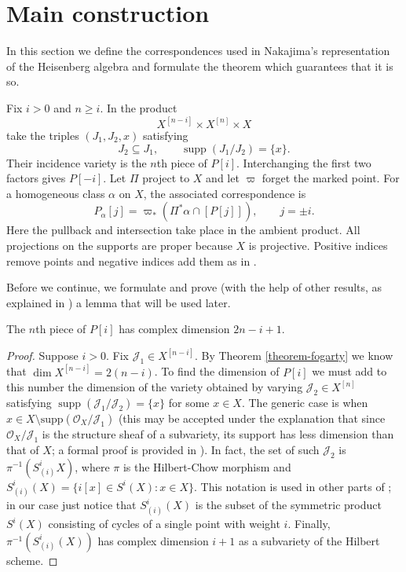 \section{Main construction}
\label{section-main-construction}

\noindent
In this section we define the
correspondences used in Nakajima's
representation
of the Heisenberg algebra and formulate
the theorem which guarantees that it is so.

Fix $i>0$ and $n\geq i$. In the product
$$
X^{[n-i]}\times X^{[n]}\times X
$$
take the triples $(J_1,J_2,x)$ satisfying
$$
J_2\subseteq J_1,\qquad
\operatorname{supp}(J_1/J_2)=\{x\}.
$$
Their incidence variety is the $n$th piece
of $P[i]$. Interchanging the first two
factors gives $P[-i]$. Let $\Pi$ project to
$X$ and let $\varpi$ forget the marked
point. For a homogeneous class $\alpha$ on
$X$, the associated correspondence is
\begin{equation}
\label{equation-correspondence-p}
P_\alpha[j]=\varpi_*
  (\Pi^*\alpha\cap[P[j]]),\qquad j=\pm i.
\end{equation}
Here the pullback and intersection take
place in the ambient product. All
projections on the supports are proper
because $X$ is projective. Positive indices
remove points and negative indices add them
as in \cite[Equation
(8.12)]{Nakajima-lectures}.

\medskip\noindent
Before we continue, we formulate and
prove (with the help of other results,
as explained in \cite[Section
8.3]{Nakajima-lectures})
a lemma that will be used later.

\begin{lemma}
\label{lemma-dimension}
The $n$th piece of $P[i]$ has complex
dimension $2n-i+1$.
\end{lemma}

\begin{proof}
Suppose $i>0$.
Fix $\mathcal{J}_1 \in X^{[n-i]}$.
By Theorem \ref{theorem-fogarty} we know that
$\dim X^{[n-i]}=2(n-i)$.
To find the dimension of $P[i]$
we must add to this number the dimension of
the variety
obtained by varying  $\mathcal{J}_2 \in
X^{[n]}$
satisfying
$\operatorname{supp}(\mathcal{J}_1/
\mathcal{J}_2)=\{x\}$
for some $x \in X$.
The generic case is when
$x \in
X\setminus\text{supp}(\mathcal{O}_X/\mathcal{J}_1)$
(this may be accepted under the explanation
that since $\mathcal{O}_X/\mathcal{J}_1$ is
the structure sheaf
of a subvariety, its support has less
dimension than that of $X$;
a formal proof is provided in \cite[Lemma
8.31]{Nakajima-lectures}).
In fact, the set of such $\mathcal{J}_2$ is
$\pi^{-1}(S^i_{(i)}X)$, where $\pi$ is
the Hilbert-Chow morphism and
$S^i_{(i)}(X)=\{i[x] \in S^i(X):x \in X\}$.
This notation is used in other parts of
\cite{Nakajima-lectures};
in our case just notice that $S^i_{(i)}(X)$
is the subset of the symmetric product
$S^i(X)$
consisting of cycles of a single point with
weight $i$.
Finally, $\pi^{-1}(S^i_{(i)}(X))$ has
complex dimension $i+1$
as a subvariety of the Hilbert scheme.
\end{proof}

